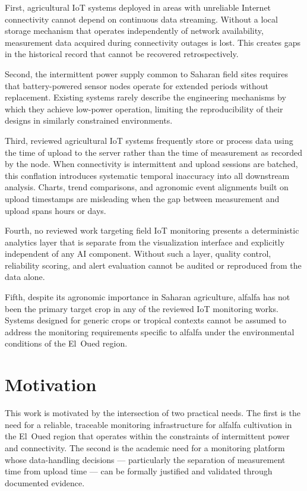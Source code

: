 First, agricultural IoT systems deployed in areas with unreliable Internet
connectivity cannot depend on continuous data streaming. Without a local storage
mechanism that operates independently of network availability, measurement data
acquired during connectivity outages is lost. This creates gaps in the historical
record that cannot be recovered retrospectively.

Second, the intermittent power supply common to Saharan field sites requires that
battery-powered sensor nodes operate for extended periods without replacement.
Existing systems rarely describe the engineering mechanisms by which they achieve
low-power operation, limiting the reproducibility of their designs in similarly
constrained environments.

Third, reviewed agricultural IoT systems frequently store or process data using
the time of upload to the server rather than the time of measurement as recorded
by the node. When connectivity is intermittent and upload sessions are batched, this
conflation introduces systematic temporal inaccuracy into all downstream analysis.
Charts, trend comparisons, and agronomic event alignments built on upload timestamps
are misleading when the gap between measurement and upload spans hours or days.

Fourth, no reviewed work targeting field IoT monitoring presents a deterministic
analytics layer that is separate from the visualization interface and explicitly
independent of any AI component. Without such a layer, quality control, reliability
scoring, and alert evaluation cannot be audited or reproduced from the data alone.

Fifth, despite its agronomic importance in Saharan agriculture, alfalfa has not
been the primary target crop in any of the reviewed IoT monitoring works. Systems
designed for generic crops or tropical contexts cannot be assumed to address the
monitoring requirements specific to alfalfa under the environmental conditions of
the El~Oued region.

\section*{Motivation}

This work is motivated by the intersection of two practical needs. The first is
the need for a reliable, traceable monitoring infrastructure for alfalfa cultivation
in the El~Oued region that operates within the constraints of intermittent power
and connectivity. The second is the academic need for a monitoring platform whose
data-handling decisions — particularly the separation of measurement time from
upload time — can be formally justified and validated through documented evidence.

